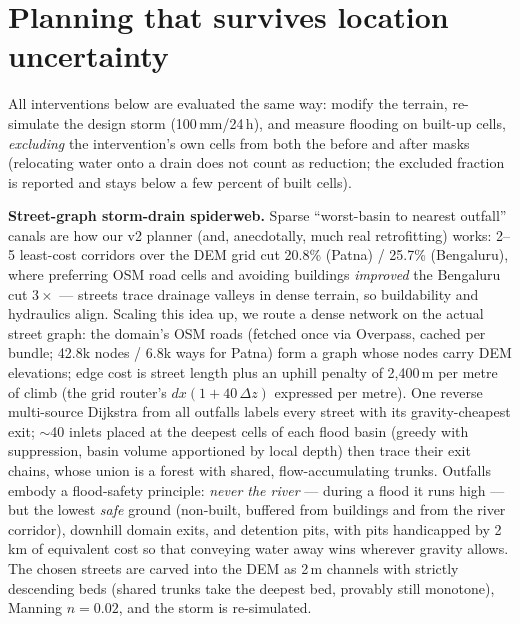 \documentclass[10pt]{article}
\begin{document}
\section{Planning that survives location uncertainty}
\label{sec:planning}
All interventions below are evaluated the same way: modify the terrain, re-simulate the design
storm (100\,mm/24\,h), and measure flooding on built-up cells, \emph{excluding} the intervention's
own cells from both the before and after masks (relocating water onto a drain does not count as
reduction; the excluded fraction is reported and stays below a few percent of built cells).

\textbf{Street-graph storm-drain spiderweb.} Sparse ``worst-basin to nearest outfall'' canals are
how our v2 planner (and, anecdotally, much real retrofitting) works: 2--5 least-cost corridors over
the DEM grid cut 20.8\% (Patna) / 25.7\% (Bengaluru), where preferring OSM road cells and avoiding
buildings \emph{improved} the Bengaluru cut $3\times$ --- streets trace drainage valleys in dense
terrain, so buildability and hydraulics align. Scaling this idea up, we route a dense network on
the actual street graph: the domain's OSM roads (fetched once via Overpass, cached per bundle;
42.8k nodes / 6.8k ways for Patna) form a graph whose nodes carry DEM elevations; edge cost is
street length plus an uphill penalty of 2{,}400\,m per metre of climb (the grid router's
$dx(1+40\,\Delta z)$ expressed per metre). One reverse multi-source Dijkstra from all outfalls
labels every street with its gravity-cheapest exit; $\sim$40 inlets placed at the deepest cells of
each flood basin (greedy with suppression, basin volume apportioned by local depth) then trace
their exit chains, whose union is a forest with shared, flow-accumulating trunks. Outfalls embody a
flood-safety principle: \emph{never the river} --- during a flood it runs high --- but the lowest
\emph{safe} ground (non-built, buffered from buildings and from the river corridor), downhill
domain exits, and detention pits, with pits handicapped by 2\,km of equivalent cost so that
conveying water away wins wherever gravity allows. The chosen streets are carved into the DEM as
2\,m channels with strictly descending beds (shared trunks take the deepest bed, provably still
monotone), Manning $n=0.02$, and the storm is re-simulated.
\end{document}
